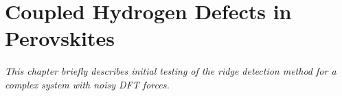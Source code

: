 \chapter{Coupled Hydrogen Defects in Perovskites}
\label{chap:perovskites}

\textit{This chapter briefly describes initial testing of the ridge detection method for a complex system with noisy DFT forces.}




